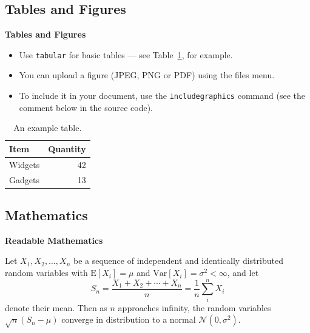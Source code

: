 \documentclass[aspectratio=169]{beamer}
\begin{document}
\subsection{Tables and Figures}

\begin{frame}{\textbf{Tables and Figures}}\vspace{3.5mm}

\begin{itemize}
\item Use \texttt{tabular} for basic tables --- see Table~\ref{tab:widgets}, for example.
\item You can upload a figure (JPEG, PNG or PDF) using the files menu. 
\item To include it in your document, use the \texttt{includegraphics} command (see the comment below in the source code).
\end{itemize}


\begin{table}
\centering
\begin{tabular}{l|r}
Item & Quantity \\\hline
Widgets & 42 \\
Gadgets & 13
\end{tabular}
\caption{\label{tab:widgets}An example table.}
\end{table}

\end{frame}
\subsection{Mathematics}
\begin{frame}{\textbf{Readable Mathematics}}\vspace{3.5mm}

Let $X_1, X_2, \ldots, X_n$ be a sequence of independent and identically distributed random variables with $\text{E}[X_i] = \mu$ and $\text{Var}[X_i] = \sigma^2 < \infty$, and let
$$S_n = \frac{X_1 + X_2 + \cdots + X_n}{n}
      = \frac{1}{n}\sum_{i}^{n} X_i$$
denote their mean. Then as $n$ approaches infinity, the random variables $\sqrt{n}(S_n - \mu)$ converge in distribution to a normal $\mathcal{N}(0, \sigma^2)$.

\end{frame}
\end{document}
